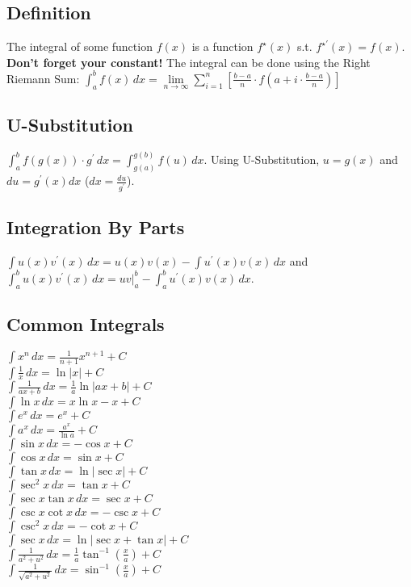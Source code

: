 \documentclass[10pt,landscape,letterpaper]{cheatsheet}
\begin{document}
\subsection*{Definition}
The integral of some function $f(x)$ is a function $f^{\star}(x)$ s.t. $f^{\star\prime}(x)=f(x)$. \textbf{Don't forget your constant!}
The integral can be done using the Right Riemann Sum:
$\int_{a}^{b} f(x) \,dx = \lim\limits_{n\to \infty}\sum_{i=1}^{n}\left[\frac{b-a}{n}\cdot f(a+i\cdot\frac{b-a}{n})\right]$

\subsection*{U-Substitution}
$ \int_{a}^{b} f(g(x)) \cdot g^{\prime} \,dx = \int_{g(a)}^{g(b)} f(u) \,dx $. Using U-Substitution, $u=g(x)$ and $du=g^{\prime}(x)dx$ ($dx=\frac{du}{g^{\prime}}$).

\subsection*{Integration By Parts}
$\int u(x)v^{\prime}(x) \,dx = u(x)v(x) - \int u^{\prime}(x)v(x) \,dx $ and $ \int_{a}^{b} u(x)v^{\prime}(x) \,dx = uv\vert_{a}^{b} - \int_{a}^{b} u^{\prime}(x)v(x) \,dx$.

\subsection*{Common Integrals}
$ \int x^n \,dx = \frac{1}{n+1}x^{n+1} + C $ \\
$ \int \frac{1}{x} \,dx = \ln{\left\lvert x \right\rvert} + C $ \\
$ \int \frac{1}{ax+b} \,dx = \frac{1}{a} \ln{\left\lvert ax+b \right\rvert } + C $ \\
$ \int \ln{x} \,dx = x\ln{x} - x + C $ \\
$ \int e^x \,dx = e^x + C $ \\
$ \int a^x \,dx = \frac{a^x}{\ln{a}} + C $ \\
$ \int \sin{x} \,dx = -\cos{x} + C $ \\
$ \int \cos{x} \,dx = \sin{x} + C $ \\
$ \int \tan{x} \,dx = \ln{\left\lvert \sec{x} \right\rvert} + C $ \\
$ \int \sec^2{x} \,dx = \tan{x} + C $ \\
$ \int \sec{x}\tan{x} \,dx = \sec{x} + C $ \\
$ \int \csc{x}\cot{x} \,dx = -\csc{x} + C $ \\
$ \int \csc^2{x} \,dx = -\cot{x} + C $ \\
$ \int \sec{x} \,dx = \ln{\left\lvert \sec{x} + \tan{x} \right\rvert} + C $ \\
$ \int \frac{1}{a^2+u^2} \,dx = \frac{1}{a}\tan^{-1}\left({\frac{x}{a}}\right) + C $ \\
$ \int \frac{1}{\sqrt{a^2+u^2}} \,dx = \sin^{-1}\left({\frac{x}{a}}\right) + C $ \\
\end{document}

